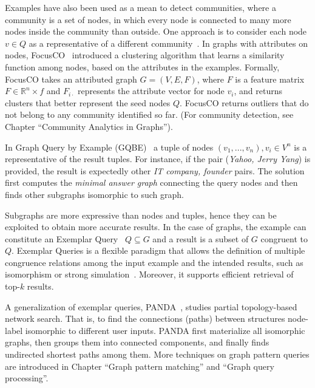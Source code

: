 Examples have also been used as a mean to detect communities, 
where a community is a set of nodes, in which every node is connected to many more nodes inside the community than outside. 
One approach is to consider each node $v \in Q$ as a representative of a different community~\citep{staudt2014detecting}. 
In graphs with attributes on nodes, FocusCO~\citep{perozzi2014focused} introduced a clustering algorithm that learns a similarity function among nodes, based on the attributes in the examples.
Formally, FocusCO takes an attributed graph $G = (V,E,F)$, where $F$ is a feature matrix $F \in \mathbb{R}^n\times f$ and $F_{i\cdot}$ represents the attribute vector for node $v_i$, and returns clusters that better represent the seed nodes $Q$.
FocusCO returns outliers that do not belong to any community identified so far. 
(For community detection, see Chapter ``Community Analytics in Graphs'').  



In Graph Query by Example (GQBE)~\citep{jayaram2015querying} a tuple of nodes $(v_1, ..., v_n), v_i \in V^n$ is a representative of the result tuples. 
For instance, if the pair (\emph{Yahoo, Jerry Yang}) is provided, the result is expectedly other \emph{IT company, founder} pairs. 
The solution first computes the \emph{minimal answer graph} connecting the query nodes and then finds other subgraphs isomorphic to such graph. 

Subgraphs are more expressive than nodes and tuples, hence they can be exploited to obtain more accurate results. 
In the case of graphs, the example can constitute an Exemplar Query~\citep{mottin2016exemplar} $Q\subseteq G$ and a result is a subset of $G$ congruent to $Q$.
Exemplar Queries is a flexible paradigm that allows the definition of multiple congruence relations among the input example and the intended results, such as isomorphism or strong simulation~\citep{ma2014strong}. 
Moreover, it supports efficient retrieval of top-$k$ results. 

A generalization of exemplar queries, PANDA~\citep{xie2017panda}, studies partial topology-based network search. 
That is, to find the connections (paths) between structures node-label isomorphic to different user inputs. 
PANDA first materialize all isomorphic graphs, then groups them into connected components, and finally finds undirected shortest paths among them. 
More techniques on graph pattern queries are introduced 
in Chapter ``Graph pattern matching'' and 
``Graph query processing''.


